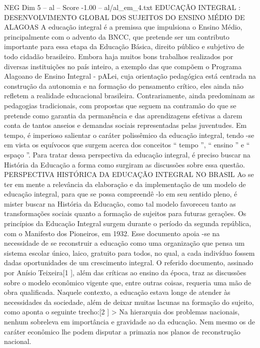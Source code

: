 \begin{textsample}{NEG Dim 5 – al – Score -1.00 – al/al\_em\_4.txt}  \label{ex:f5_neg_244}
EDUCAÇÃO INTEGRAL : DESENVOLVIMENTO GLOBAL DOS SUJEITOS DO ENSINO MÉDIO DE ALAGOAS A educação integral é a premissa que impulsiona o Ensino Médio, principalmente com o advento da BNCC, que pretende ser um contributo importante para essa etapa da Educação Básica, direito público e subjetivo de todo cidadão brasileiro.
Embora haja muitos bons trabalhos realizados por diversas instituições no país inteiro, a exemplo das que compõem o Programa Alagoano de Ensino Integral - pALei, cuja orientação pedagógica está centrada na construção da autonomia e na formação do pensamento crítico, eles ainda não refletem a realidade educacional brasileira.
Contrariamente, ainda predominam as pedagogias tradicionais, com propostas que seguem na contramão do que se pretende como garantia da permanência e das aprendizagens efetivas a darem conta de tantos anseios e demandas sociais representadas pelas juventudes.
Em tempo, é imperioso salientar o caráter polissêmico da educação integral, tendo -se em vista os equívocos que surgem acerca dos conceitos “ tempo ”, “ ensino ” e “ espaço ”.
Para tratar dessa perspectiva da educação integral, é preciso buscar na História da Educação a forma como surgiram as discussões sobre essa questão.
PERSPECTIVA HISTÓRICA DA EDUCAÇÃO INTEGRAL NO BRASIL Ao se ter em mente a relevância da elaboração e da implementação de um modelo de educação integral, para que se possa compreendê -lo em seu sentido pleno, é mister buscar na História da Educação, como tal modelo favoreceu tanto as transformações sociais quanto a formação de sujeitos para futuras gerações.
Os princípios da Educação Integral surgem durante o período da segunda república, com o Manifesto dos Pioneiros, em 1932.
Esse documento apoia -se na necessidade de se reconstruir a educação como uma organização que pensa um sistema escolar único, laico, gratuito para todos, no qual, a cada indivíduo fossem dadas oportunidades de um crescimento integral.
O referido documento, assinado por Anísio Teixeira[1 ], além das críticas ao ensino da época, traz as discussões sobre o modelo econômico vigente que, entre outras coisas, requeria uma mão de obra qualificada.
Naquele contexto, a educação estava longe de atender às necessidades da sociedade, além de deixar muitas lacunas na formação do sujeito, como aponta o seguinte trecho:[2 ] > Na hierarquia dos problemas nacionais, nenhum sobreleva em importância e gravidade ao da educação.
Nem mesmo os de caráter econômico lhe podem disputar a primazia nos planos de reconstrução nacional.

\end{textsample}
